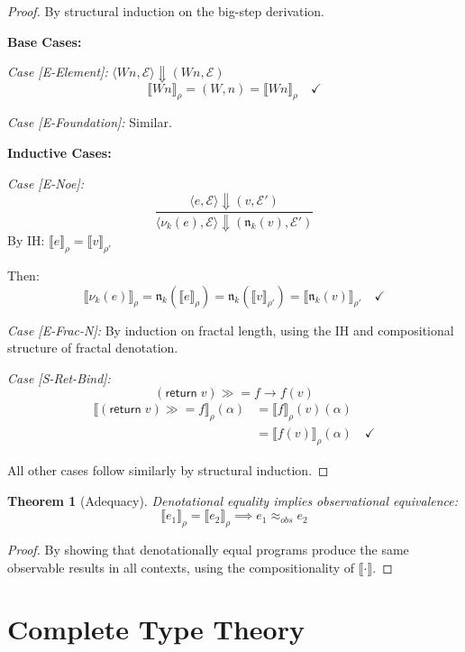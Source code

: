 \documentclass[11pt,twoside,openright]{book}
\theoremstyle{definition}
\theoremstyle{plain}
\newtheorem{theorem}[definition]{Theorem}
\theoremstyle{remark}
\newcommand{\sem}[1]{\llbracket #1 \rrbracket}
\newcommand{\noe}[1]{\nu_{#1}}
\newcommand{\rpmret}{\mathsf{return}}
\newcommand{\rpmbind}{\mathbin{\gg\!=}}
\newcommand{\smallstep}{\to}
\newcommand{\bigstep}{\Downarrow}
\begin{document}
\begin{proof}
By structural induction on the big-step derivation.

\textbf{Base Cases:}

\textit{Case [E-Element]:} $\langle Wn, \mathcal{E} \rangle \bigstep (Wn, \mathcal{E})$
\[
\sem{Wn}_\rho = (W, n) = \sem{Wn}_\rho \quad \checkmark
\]

\textit{Case [E-Foundation]:} Similar.

\textbf{Inductive Cases:}

\textit{Case [E-Noe]:}
\[
\frac{\langle e, \mathcal{E} \rangle \bigstep (v, \mathcal{E}')}
{\langle \noe{k}(e), \mathcal{E} \rangle \bigstep (\mathfrak{n}_k(v), \mathcal{E}')}
\]
By IH: $\sem{e}_\rho = \sem{v}_{\rho'}$

Then:
\[
\sem{\noe{k}(e)}_\rho = \mathfrak{n}_k(\sem{e}_\rho) = \mathfrak{n}_k(\sem{v}_{\rho'}) = \sem{\mathfrak{n}_k(v)}_{\rho'} \quad \checkmark
\]

\textit{Case [E-Frac-N]:} By induction on fractal length, using the IH and compositional structure of fractal denotation.

\textit{Case [S-Ret-Bind]:}
\[
(\rpmret\; v) \rpmbind f \smallstep f(v)
\]
\begin{align}
\sem{(\rpmret\; v) \rpmbind f}_\rho(\alpha) &= \sem{f}_\rho(v)(\alpha) \\
&= \sem{f(v)}_\rho(\alpha) \quad \checkmark
\end{align}

All other cases follow similarly by structural induction.
\end{proof}

\begin{theorem}[Adequacy]
\label{thm:adequacy}
Denotational equality implies observational equivalence:
\[
\sem{e_1}_\rho = \sem{e_2}_\rho \implies e_1 \approx_{obs} e_2
\]
\end{theorem}

\begin{proof}
By showing that denotationally equal programs produce the same observable results in all contexts, using the compositionality of $\sem{\cdot}$.
\end{proof}

\part{Complete Type Theory}
\end{document}
